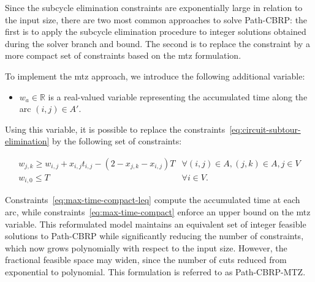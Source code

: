Since the subcycle elimination constraints are exponentially large in relation
to the input size, there are two most common approaches to solve Path-CBRP: the
first is to apply the subcycle elimination procedure to integer solutions
obtained during the solver branch and bound. The second is to replace the
constraint by a more compact set of constraints based on the \gls{mtz}
formulation.


To implement the \gls{mtz} approach, we introduce the following additional
variable:

\begin{itemize}
	\item $w_{a} \in \mathbb{R}$ is a real-valued variable representing the accumulated
	      time along the arc $(i, j) \in A'$.
\end{itemize}

Using this variable, it is possible to replace the
constraints~\eqref{eq:circuit-subtour-elimination} by the following set of
constraints:

\begin{align}
	 & w_{j,k} \geq w_{i,j} + x_{i,j}t_{i,j} - (2 - x_{j,k} - x_{i,j})T & \forall (i, j) \in A, (j, k) \in A, j \in V \label{eq:max-time-compact-leq}                               \\
	 & w_{i,0} \leq T                                                   & \forall i \in V.                                                            & \label{eq:max-time-compact}
\end{align}

Constraints~\eqref{eq:max-time-compact-leq} compute the accumulated time at each
arc, while constraints~\eqref{eq:max-time-compact} enforce an upper bound on the
\gls{mtz} variable. This reformulated model maintains an equivalent set of
integer feasible solutions to Path-CBRP while significantly reducing the number
of constraints, which now grows polynomially with respect to the input size.
However, the fractional feasible space may widen, since the number of cuts
reduced from exponential to polynomial. This formulation is referred to as
Path-CBRP-MTZ.

